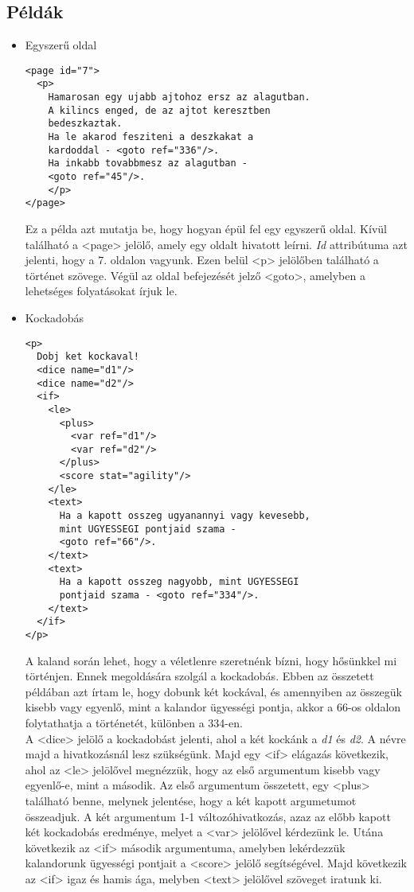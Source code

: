 \documentclass[12pt,a4paper,oneside]{report}
\newcommand{\attr}{\emph}
\begin{document}
    \subsection{Példák}
    \begin{itemize}
      \item Egyszerű oldal
        \begin{lstlisting}
<page id="7">
  <p>
    Hamarosan egy ujabb ajtohoz ersz az alagutban.
    A kilincs enged, de az ajtot keresztben
    bedeszkaztak.
    Ha le akarod fesziteni a deszkakat a
    kardoddal - <goto ref="336"/>.
    Ha inkabb tovabbmesz az alagutban -
    <goto ref="45"/>.
    </p>
</page>
      \end{lstlisting}
      Ez a példa azt mutatja be, hogy hogyan épül fel egy egyszerű
      oldal. Kívül található a <{\color{Tag}page}> jelölő, amely egy
      oldalt hivatott leírni. \attr{Id} attribútuma azt jelenti, hogy a
      7. oldalon vagyunk. Ezen belül <{\color{Tag}p}> jelölőben
      található a történet szövege. Végül az oldal befejezését jelző
      <{\color{Tag}goto}>, amelyben a lehetséges folyatásokat írjuk
      le.
      \item Kockadobás
      
        \begin{lstlisting}
<p>
  Dobj ket kockaval!
  <dice name="d1"/>
  <dice name="d2"/>
  <if>
    <le>
      <plus>
        <var ref="d1"/>
        <var ref="d2"/>
      </plus>
      <score stat="agility"/>
    </le>
    <text>
      Ha a kapott osszeg ugyanannyi vagy kevesebb,
      mint UGYESSEGI pontjaid szama -
      <goto ref="66"/>.
    </text>
    <text>
      Ha a kapott osszeg nagyobb, mint UGYESSEGI
      pontjaid szama - <goto ref="334"/>.
    </text>
  </if>
</p>
        \end{lstlisting}
        A kaland során lehet, hogy a véletlenre szeretnénk bízni, hogy
        hősünkkel mi történjen. Ennek megoldására szolgál a
        kockadobás. Ebben az összetett példában azt írtam le, hogy
        dobunk két kockával, és amennyiben az összegük kisebb vagy
        egyenlő, mint a kalandor ügyességi pontja, akkor a 66-os oldalon
        folytathatja a történetét, különben a 334-en.\\
        A <{\color{Tag}dice}> jelölő a
        kockadobást jelenti, ahol a két kockánk a \emph{d1} és \emph{d2}. A névre majd
        a hivatkozásnál lesz szükségünk. Majd egy <{\color{Tag}if}> elágazás
        következik, ahol az <{\color{Tag}le}> jelölővel megnézzük, hogy az első
        argumentum kisebb vagy egyenlő-e, mint a második. Az első
        argumentum összetett, egy <{\color{Tag}plus}> található benne, melynek
        jelentése, hogy a két kapott argumetumot összeadjuk. A két
        argumentum 1-1 változóhivatkozás, azaz az előbb kapott két
        kockadobás eredménye, melyet a <{\color{Tag}var}> jelölővel kérdezünk
        le. Utána következik az <{\color{Tag}if}> második argumentuma, amelyben
        lekérdezzük kalandorunk ügyességi pontjait a <{\color{Tag}score}> jelölő
        segítségével. Majd következik az <{\color{Tag}if}> igaz és hamis ága, melyben
        <{\color{Tag}text}> jelölővel szöveget iratunk ki.
      

\end{itemize}
\end{document}

